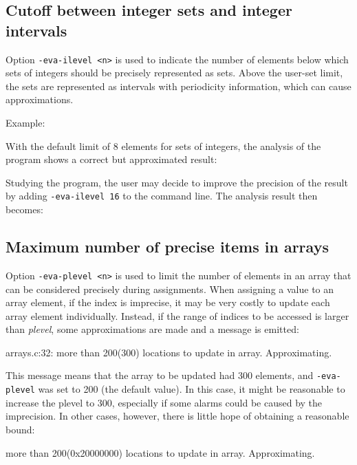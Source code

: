 \documentclass{frama-c-book}
\begin{document}
\subsection{Cutoff between integer sets and integer intervals}

Option \verb|-eva-ilevel <n>| is used to indicate the number of elements
below which sets of integers should be precisely represented as sets.
Above the user-set limit, the sets are represented as intervals
with periodicity information, which can cause approximations.

Example:

With the default limit of 8 elements for sets of integers, the
analysis of the program shows a correct but approximated result:


Studying the program, the user may decide to improve the precision of
the result by adding \verb|-eva-ilevel 16| to the command line. The
analysis result then becomes:


\subsection{Maximum number of precise items in arrays}

Option \verb|-eva-plevel <n>| is used to limit the number of elements
in an array that can be considered precisely during assignments.
When assigning a value to an array element, if the index is imprecise,
it may be very costly to update each array element individually.
Instead, if the range of indices to be accessed is larger than {\em plevel},
some approximations are made and a message is emitted:

\begin{listing-log}
 arrays.c:32:
  more than 200(300) locations to update in array. Approximating.
\end{listing-log}

This message means that the array to be updated had 300 elements, and
\verb|-eva-plevel| was set to 200 (the default value). In this case, it
might be reasonable to increase the plevel to 300, especially if some alarms
could be caused by the imprecision. In other cases, however, there is little
hope of obtaining a reasonable bound:

\begin{listing-log}
more than 200(0x20000000) locations to update in array. Approximating.
\end{listing-log}
\end{document}
